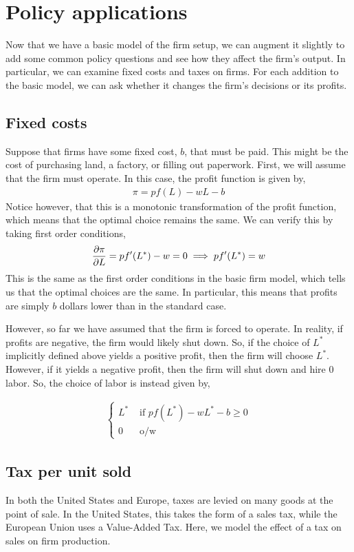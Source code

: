 \section{Policy applications}
Now that we have a basic model of the firm setup, we can augment it slightly to add some common policy questions and see how they affect the firm's output. In particular, we can examine ƒixed costs and taxes on firms. For each addition to the basic model, we can ask whether it changes the firm's decisions or its profits. 

\subsection*{Fixed costs}
Suppose that firms have some fixed cost, $b$, that must be paid. This might be the cost of purchasing land, a factory, or filling out paperwork. First, we will assume that the firm must operate. In this case, the profit function is given by,
\begin{align*}
    \pi = p f(L) - w L - b
\end{align*}
Notice however, that this is a monotonic transformation of the profit function, which means that the optimal choice remains the same. We can verify this by taking first order conditions,
\begin{align*}
    \frac{\partial \pi}{\partial L} = pf'(L^*) - w = 0 \implies pf'(L^*) = w
\end{align*}
This is the same as the first order conditions in the basic firm model, which tells us that the optimal choices are the same. In particular, this means that profits are simply $b$ dollars lower than in the standard case.

However, so far we have assumed that the firm is forced to operate. In reality, if profits are negative, the firm would likely shut down. So, if the choice of $L^*$ implicitly defined above yields a positive profit, then the firm will choose $L^*$. However, if it yields a negative profit, then the firm will shut down and hire 0 labor. So, the choice of labor is instead given by,

\begin{align*}
    \begin{cases}
        L^* & \text{ if } p f(L^*) - w L^* - b \geq 0 \\
        0 & \text{ o/w }
    \end{cases}
\end{align*}

\subsection*{Tax per unit sold}
In both the United States and Europe, taxes are levied on many goods at the point of sale. In the United States, this takes the form of a sales tax, while the European Union uses a Value-Added Tax. Here, we model the effect of a tax on sales on firm production. 

